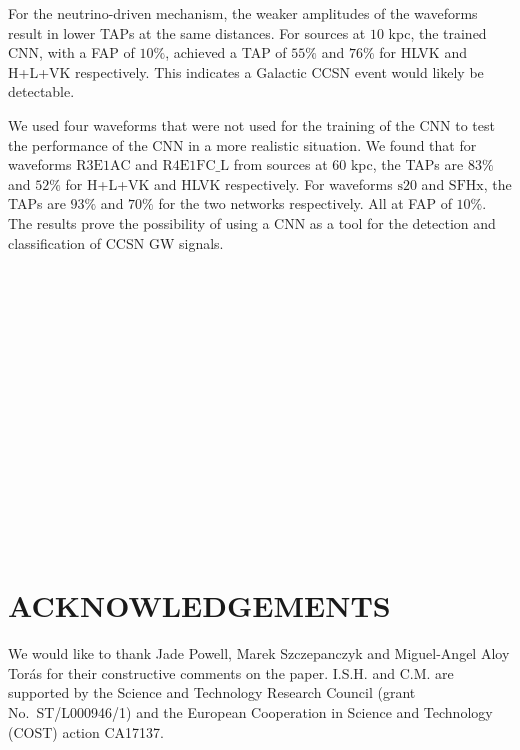 \documentclass[aps,twocolumn,showpacs,groupedaddress, nofootinbib]{revtex4}  %
\begin{document}
%
%
For the neutrino-driven mechanism, the weaker amplitudes of the waveforms
result in lower \acp{TAP} at the same distances.  For sources at $10$ kpc, the
trained \ac{CNN}, with a \ac{FAP} of $10\%$, achieved a \ac{TAP} of $55\%$ and
$76\%$ for HLVK and H+L+VK respectively. This indicates a Galactic \ac{CCSN}
event would likely be detectable.

%
%
We used four waveforms that were not used for the training of the \ac{CNN} to
test the performance of the \ac{CNN} in a more realistic situation. We found
that for waveforms $\text{R3E1AC}$ and $\text{R4E1FC\_L}$ from sources at
$60$ kpc, the \acp{TAP} are $83\%$ and $52\%$ for H+L+VK and HLVK respectively.
For waveforms $\text{s}20$ and $\text{SFHx}$, the \acp{TAP} are $93\%$ and
$70\%$ for the two networks respectively. All at \ac{FAP} of $10\%$. 
The results prove the possibility of
using a \ac{CNN} as a tool for the detection and classification of \ac{CCSN}
\ac{GW} signals.
\\
\\
\\
\\
\\
\\
\\
\\
\\
\\
\\
\\
\\
\\
\\
\\
\section{ACKNOWLEDGEMENTS}
We would like to thank Jade Powell, Marek Szczepanczyk and Miguel-Angel Aloy Torás for their 
constructive comments on the paper.
I.S.H. and C.M. are supported by the Science and Technology Research Council
(grant No.~ST/L000946/1) and the European Cooperation in Science and
Technology (COST) action CA17137. 


%
\end{document}
